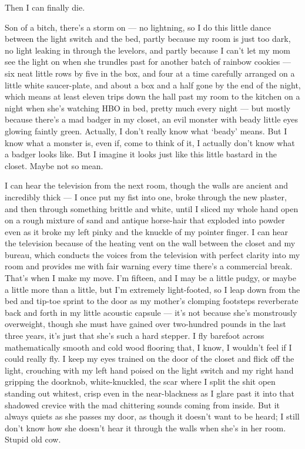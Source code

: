 Then I can finally die. 
 





Son of a bitch, there's a storm on --- no lightning, so I
do this little dance between the light switch and the bed, partly
because my room is just too dark, no light leaking in through the
levelors, and partly because I can't let my mom see the light
on when she trundles past for another batch of rainbow cookies
--- six neat little rows by five in the box, and four at a time
carefully arranged on a little white saucer-plate, and about a box
and a half gone by the end of the night, which means at least
eleven trips down the hall past my room to the kitchen on a night
when she's watching HBO in bed, pretty much every night
--- but mostly because there's a mad badger in my closet,
an evil monster with beady little eyes glowing faintly green.
Actually, I don't really know what `beady' means.
But I know what a monster is, even if, come to think of it, I
actually don't know what a badger looks like. But I imagine
it looks just like this little bastard in the closet. Maybe not so
mean.

I can hear the television from the next room, though the walls are
ancient and incredibly thick --- I once put my fist into one,
broke through the new plaster, and then through something brittle
and white, until I sliced my whole hand open on a rough mixture of
sand and antique horse-hair that exploded into powder even as it
broke my left pinky and the knuckle of my pointer finger. I can
hear the television because of the heating vent on the wall between
the closet and my bureau, which conducts the voices from the
television with perfect clarity into my room and provides me with
fair warning every time there's a commercial break.
That's when I make my move. I'm fifteen, and I may be a
little pudgy, or maybe a little more than a little, but I'm
extremely light-footed, so I leap down from the bed and tip-toe
sprint to the door as my mother's clomping footsteps
reverberate back and forth in my little acoustic capsule ---
it's not because she's monstrously overweight, though
she must have gained over two-hundred pounds in the last three
years, it's just that she's such a hard stepper. I fly
barefoot across mathematically smooth and cold wood flooring that,
I know, I wouldn't feel if I could really fly. I keep my eyes
trained on the door of the closet and flick off the light,
crouching with my left hand poised on the light switch and my right
hand gripping the doorknob, white-knuckled, the scar where I split
the shit open standing out whitest, crisp even in the
near-blackness as I glare past it into that shadowed crevice with
the mad chittering sounds coming from inside. But it always quiets
as she passes my door, as though it doesn't want to be heard;
I still don't know how she doesn't hear it through the
walls when she's in her room. Stupid old cow.

